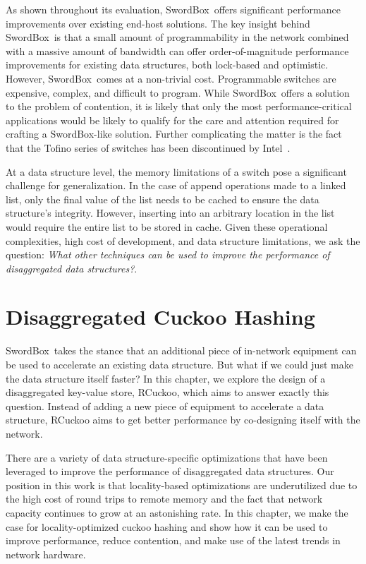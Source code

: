 \documentclass[12pt]{ucsddissertation}
\newcommand{\sword}{SwordBox}
\begin{document}
As shown throughout its evaluation, \sword\ offers significant performance improvements over
existing end-host solutions. The key insight behind \sword\ is that a small amount of
programmability in the network combined with a massive amount of bandwidth can offer
order-of-magnitude performance improvements for existing data structures, both lock-based and
optimistic. However, \sword\ comes at a non-trivial cost. Programmable switches are expensive,
complex, and difficult to program. While \sword\ offers a solution to the problem of contention, it
is likely that only the most performance-critical applications would be likely to qualify for the
care and attention required for crafting a \sword-like solution. Further complicating the matter is
the fact that the Tofino series of switches has been discontinued by Intel~\cite{tofino-cancelled}.

At a data structure level, the memory limitations of a switch pose a significant challenge for
generalization. In the case of append operations made to a linked list, only the final value of the
list needs to be cached to ensure the data structure's integrity. However, inserting into an
arbitrary location in the list would require the entire list to be stored in cache. Given these
operational complexities, high cost of development, and data structure limitations, we ask the
question: \textit{What other techniques can be used to improve the performance of disaggregated data
structures?}.


\chapter{Disaggregated Cuckoo Hashing}
\label{chap:rcuckoo}


\sword\ takes the stance that an additional piece of in-network equipment can be used to accelerate
an existing data structure. But what if we could just make the data structure itself faster? In this
chapter, we explore the design of a disaggregated key-value store, RCuckoo, which aims to answer
exactly this question. Instead of adding a new piece of equipment to accelerate a data structure,
RCuckoo aims to get better performance by co-designing itself with the network.

There are a variety of data structure-specific optimizations that have been leveraged to improve the
performance of disaggregated data structures.  Our position in this work is that locality-based
optimizations are underutilized due to the high cost of round trips to remote memory and the fact
that network capacity continues to grow at an astonishing rate. In this chapter, we make the case
for locality-optimized cuckoo hashing and show how it can be used to improve performance, reduce
contention, and make use of the latest trends in network hardware.
\end{document}
